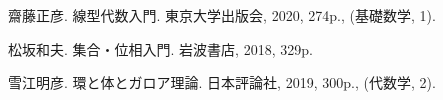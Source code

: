 \documentclass[../../main]{subfiles}
\begin{document}
\begin{thebibliography}{99}
    齋藤正彦. 線型代数入門. 東京大学出版会, 2020, 274p., (基礎数学, 1).

    松坂和夫. 集合・位相入門. 岩波書店, 2018, 329p.

    雪江明彦. 環と体とガロア理論. 日本評論社, 2019, 300p., (代数学, 2).
\end{thebibliography}
\end{document}
